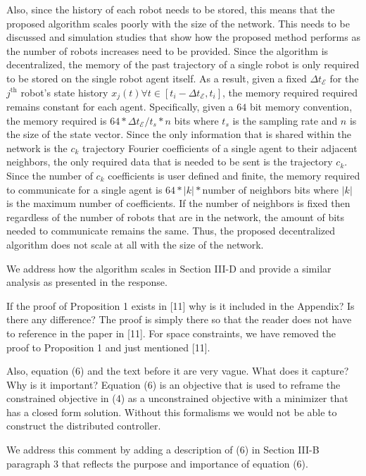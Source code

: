\documentclass[10pt]{article}
\begin{document}
\begin{response}{
Also, since the history of each robot needs to be stored, this means
that the proposed algorithm scales poorly with the size of the network.
This needs to be discussed and simulation studies that show how the
proposed method performs as the number of robots increases need to be
provided.
}
Since the algorithm is decentralized, the memory of the past trajectory of a single robot is only required to be stored on the single robot agent itself.
As a result, given a fixed $\Delta t_\mathcal{E}$ for the $j^\text{th}$ robot's state history $x_j(t) \forall t \in \left[ t_i -\Delta t_\mathcal{E}, t_i\right]$, the memory required required remains constant for each agent. 
Specifically, given a $64$ bit memory convention, the memory required is $64 * \Delta t_\mathcal{E}/t_s * n$ bits where $t_s$ is the sampling rate and $n$ is the size of the state vector.
Since the only information that is shared within the network is the $c_k$ trajectory Fourier coefficients of a single agent to their adjacent neighbors, the only required data that is needed to be sent is the trajectory $c_k$. 
Since the number of $c_k$ coefficients is user defined and finite, the memory required to communicate for a single agent is $64 * |k| * \text{number of neighbors}$ bits where $|k|$ is the maximum number of coefficients.
If the number of neighbors is fixed then regardless of the number of robots that are in the network, the amount of bits needed to communicate remains the same. 
Thus, the proposed decentralized algorithm does not scale at all with the size of the network.

We address how the algorithm scales in Section III-D and provide a similar analysis as presented in the response.
\end{response}

\begin{response}{If the proof of Proposition 1 exists in [11] why is it included in
the Appendix? Is there any difference?}
 The proof is simply there so that the reader does not have to reference in the paper in [11]. 
 For space constraints, we have removed the proof to Proposition 1 and just mentioned [11].
\end{response}


\begin{response}{
Also, equation (6) and the text before it are very vague. What does
it capture? Why is it important?
}
Equation (6) is an objective that is used to reframe the constrained objective in (4) as a unconstrained objective with a minimizer that has a closed form solution. 
Without this formalisms we would not be able to construct the distributed controller.

We address this comment by adding a description of (6) in Section III-B paragraph 3 that reflects the purpose and importance of equation (6).
\end{response}
\end{document}
